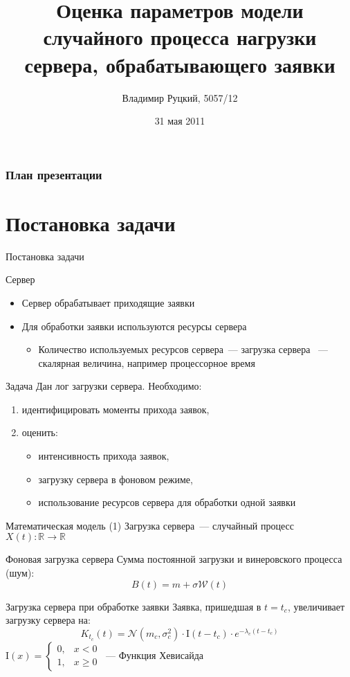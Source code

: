 \documentclass[utf8]{beamer}
\title[Оценка параметров случайного процесса]{Оценка параметров модели случайного процесса нагрузки сервера, обрабатывающего заявки}
\author{Владимир Руцкий, 5057/12}
\institute[СПбГПУ]{Санкт-Петербургский государственный политехнический университет}
\date{31 мая 2011}
\begin{document}
\begin{frame}
\titlepage
\end{frame}


\begin{frame}
\frametitle{План презентации}
\tableofcontents
\end{frame}


\section{Постановка задачи}
\begin{frame}{Постановка задачи}
\begin{block}{Сервер}
  \begin{itemize}
    \item Сервер обрабатывает приходящие заявки
    \item Для обработки заявки используются ресурсы сервера
      \begin{itemize}
        \item Количество используемых ресурсов сервера~--- загрузка сервера ~--- скалярная величина, например процессорное время
      \end{itemize}
  \end{itemize}
\end{block}

\begin{block}{Задача}
  Дан лог загрузки сервера. 
  Необходимо:
  \begin{enumerate}
    \item идентифицировать моменты прихода заявок,
    \item оценить:
      \begin{itemize}
        \item интенсивность прихода заявок,
        \item загрузку сервера в фоновом режиме,
        \item использование ресурсов сервера для обработки одной заявки
      \end{itemize}
  \end{enumerate}
\end{block}
\end{frame}


\begin{frame}{Математическая модель (1)}
Загрузка сервера~--- случайный процесс $X(t)\colon \mathbb{R} \rightarrow \mathbb{R}$
\begin{block}{Фоновая загрузка сервера}
  Сумма постоянной загрузки и винеровского процесса (шум): 
  $$B(t) = m + \sigma \mathcal{W}(t)$$
\end{block}
\begin{block}{Загрузка сервера при обработке заявки}
  Заявка, пришедшая в $t=t_c$, увеличивает загрузку сервера на:
  $$K_{t_c}(t) = \mathcal{N}(m_c, \sigma_c^2) \cdot \mathrm{I}(t - t_c) \cdot 
    e^{-\lambda_c(t - t_c)}$$
  {\footnotesize $\mathrm{I}(x) = \left\{
    \begin{array}{rl}
      0, & x < 0 \\
      1, & x \geqslant 0
    \end{array}\right.$~--- Функция Хевисайда}
\end{block}
\end{frame}
\end{document}
